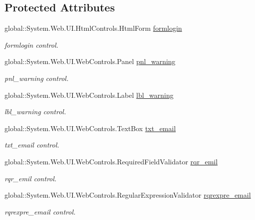 \subsection*{Protected Attributes}
\begin{DoxyCompactItemize}
\item 
global\+::\+System.\+Web.\+U\+I.\+Html\+Controls.\+Html\+Form \mbox{\hyperlink{class_admin__login_a18ef99a7f1a60d6bfd2531684b7f1df4}{formlogin}}
\begin{DoxyCompactList}\small\item\em formlogin control. \end{DoxyCompactList}\item 
global\+::\+System.\+Web.\+U\+I.\+Web\+Controls.\+Panel \mbox{\hyperlink{class_admin__login_a573527366803f07948992c342b209999}{pnl\+\_\+warning}}
\begin{DoxyCompactList}\small\item\em pnl\+\_\+warning control. \end{DoxyCompactList}\item 
global\+::\+System.\+Web.\+U\+I.\+Web\+Controls.\+Label \mbox{\hyperlink{class_admin__login_aee6b8294d8405197383b9d6aeabe06cc}{lbl\+\_\+warning}}
\begin{DoxyCompactList}\small\item\em lbl\+\_\+warning control. \end{DoxyCompactList}\item 
global\+::\+System.\+Web.\+U\+I.\+Web\+Controls.\+Text\+Box \mbox{\hyperlink{class_admin__login_a8c5540adbd310df6b51614b251e3e09a}{txt\+\_\+email}}
\begin{DoxyCompactList}\small\item\em txt\+\_\+email control. \end{DoxyCompactList}\item 
global\+::\+System.\+Web.\+U\+I.\+Web\+Controls.\+Required\+Field\+Validator \mbox{\hyperlink{class_admin__login_a43e637a72bf3673d9b2576e26a151f3a}{rqr\+\_\+emil}}
\begin{DoxyCompactList}\small\item\em rqr\+\_\+emil control. \end{DoxyCompactList}\item 
global\+::\+System.\+Web.\+U\+I.\+Web\+Controls.\+Regular\+Expression\+Validator \mbox{\hyperlink{class_admin__login_ab77100417d1dcefbb924447194a04380}{rqrexpre\+\_\+email}}
\begin{DoxyCompactList}\small\item\em rqrexpre\+\_\+email control. \end{DoxyCompactList}\item 

\end{DoxyCompactItemize}
